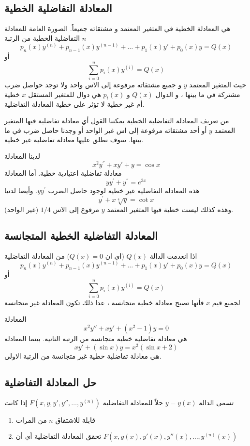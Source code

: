 \subsection*{المعادلة التفاضلية الخطية \cite{diff_eqs_sols_apps}}
    هي المعادلة الخطية في المتغير المعتمد و مشتقاته جميعاً. الصورة العامة للمعادلة التفاضلية الخطية من الرتبة $n$ 
    \[
    p_n(x)y^{(n)}+p_{n-1}(x)y^{(n-1)}+\dots+p_1(x)y'+p_0(x)y=Q(x)
    \]
    أو
    \[
    \sum_{i=0}^{n}p_i(x)y^{(i)}=Q(x)
    \]
    حيث المتغير المعتمد $y$ و جميع مشتقاته مرفوعة إلى الاس واحد ولا توجد حواصل ضرب مشتركة في ما بينها ، و الدوال $Q(x)$ و $p_i(x)$ هي دوال للمتغير المستقل $x$ خطية أم غير خطية لا تؤثر على خطية المعادلة التفاضلية.
\vskip10pt
\begin{note}
    من تعريف المعادلة التفاضلية الخطية يمكننا القول أي معادلة تفاضلية فيها المتغير المعتمد $y$ أو أحد مشتقاته مرفوعة إلى اس غير الواحد أو وجدنا حاصل ضرب في ما بينها. سوف نطلق عليها معادلة تفاضلية غير خطية.
\end{note}
\newpage
\begin{nexample}
    لدينا المعادلة
    \[
    x^2y^{''}+xy'+y=\cos x
    \]
    معادلة تفاضلية اعتيادية خطية. أما المعادلة
    \[
    yy^{'}+y^{''}=e^{3x}
    \]
    هذه المعادلة التفاضلية غير خطية لوجود حاصل الضرب $yy^{'}$. وأيضا لدنيا
\[
y^{'}+x\sqrt[4]{y}=\cot x
\]
وهذه كذلك ليست خطية فيها المتغير المعتمد $y$ مرفوع إلى الاس $1/4$ (غير الواحد).
\end{nexample}

\subsection*{المعادلة التفاضلية الخطية المتجانسة \cite{diff_eqs_sols_apps}}
اذا انعدمت الدالة $Q(x)$ (اي ان $Q(x) = 0$) من المعادلة التفاضلية
\[
p_n(x)y^{(n)}+p_{n-1}(x)y^{(n-1)}+\dots+p_1(x)y'+p_0(x)y=Q(x)
\]
أو
\[
\sum_{i=0}^{n}p_i(x)y^{(i)}=Q(x)
\]
لجميع قيم $x$ فأنها تصبح معادلة خطية متجانسة ، عدا ذلك تكون المعادلة غير متجانسة

\begin{nexample}
	المعادلة
	\[
	x^2 y'' + xy' + (x^2 - 1)y = 0
	\]
	هي معادلة تفاضلية خطية متجانسة من الرتبة الثانية. بينما المعادلة
	\[
	xy' + (\sin x)y = x^2(\sin x + 2)
	\] 
	هي معادلة تفاضلية خطية غير متجانسة من الرتبة الاولى.
\end{nexample}

\newpage

\subsection*{حل المعادلة التفاضلية \cite{diff_eqs_pt1}}
تسمى الدالة $y=y(x)$ حلاً للمعادلة التفاضلية $F(x,y,y',y'',\dots,y^{(n)})$ إذا كانت
\begin{enumerate}
    \item قابلة للاشتقاق $n$ من المرات
    \item تحقق المعادلة التفاضلية أي أن $F(x,y(x),y'(x),y''(x),\dots,y^{(n)}(x))$
\end{enumerate}


